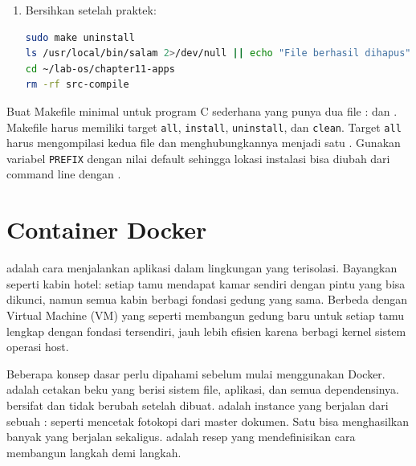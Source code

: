 \begin{enumerate}
    \item Bersihkan setelah praktek:
\begin{lstlisting}[language=bash, caption={Uninstall dan bersihkan direktori}]
sudo make uninstall
ls /usr/local/bin/salam 2>/dev/null || echo "File berhasil dihapus"
cd ~/lab-os/chapter11-apps
rm -rf src-compile
\end{lstlisting}
\end{enumerate}

\begin{challengebox}
Buat Makefile minimal untuk program C sederhana yang punya dua file :
 dan . Makefile harus memiliki target \texttt{all},
\texttt{install}, \texttt{uninstall}, dan \texttt{clean}. Target \texttt{all}
harus mengompilasi kedua file dan menghubungkannya menjadi satu .
Gunakan variabel \texttt{PREFIX} dengan nilai default  sehingga
lokasi instalasi bisa diubah dari command line dengan .
\end{challengebox}

\section{Container Docker}
\label{sec:docker-containers}

 adalah cara menjalankan aplikasi dalam lingkungan yang terisolasi.
Bayangkan  seperti kabin hotel: setiap tamu mendapat kamar sendiri
dengan pintu yang bisa dikunci, namun semua kabin berbagi fondasi gedung yang
 sama. Berbeda dengan Virtual Machine (VM) yang seperti membangun gedung baru
untuk setiap tamu lengkap dengan fondasi tersendiri,  jauh lebih
efisien karena berbagi kernel sistem operasi host.

Beberapa konsep dasar perlu dipahami sebelum mulai menggunakan Docker.
 adalah cetakan beku yang berisi sistem file, aplikasi, dan semua
dependensinya.  bersifat  dan tidak berubah setelah dibuat.
 adalah instance yang berjalan dari sebuah : seperti
mencetak fotokopi dari master dokumen. Satu  bisa menghasilkan banyak
 yang berjalan sekaligus.  adalah resep yang
mendefinisikan cara membangun  langkah demi langkah.

